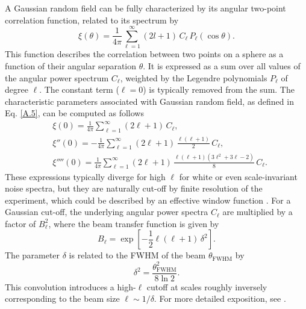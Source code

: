 \documentclass{aa}
\begin{document}
A Gaussian random field can be fully characterized by its angular two-point correlation function, related to its spectrum by
%
\begin{equation}\label{B.1}
  \xi(\theta) = \frac{1}{4\pi}\sum_{\ell=1}^{\infty} (2l+1)\, C_{\ell}\, P_{\ell}(\cos\theta) .
\end{equation}
%
This function describes the correlation between two points on a sphere as a function of their angular separation $\theta$. It is expressed as a sum over all values of the angular power spectrum $C_{\ell}$, weighted by the Legendre polynomials $P_\ell$ of degree $\ell$. The constant term ($\ell=0$) is typically removed from the sum. The characteristic parameters associated with Gaussian random field, as defined in Eq. \eqref{A.5}, can be computed as follows
%
\begin{equation}\label{B.2}
\begin{aligned}
&\xi(0) = \frac{1}{4\pi}\sum_{\ell=1}^{\infty} (2\ell+1)\, C_{\ell},\\
&\xi''(0) = -\frac{1}{4\pi}\sum_{\ell=1}^{\infty} (2\ell+1)\, \frac{\ell(\ell+1)}{2}\, C_{\ell},\\
&\xi''''(0) = \frac{1}{4\pi}\sum_{\ell=1}^{\infty} (2\ell+1)\, \frac{\ell(\ell+1)(3\ell^2+3\ell-2)}{8}\, C_{\ell}.
\end{aligned}
\end{equation}
%
These expressions typically diverge for high $\ell$ for white or even scale-invariant noise spectra, but they are naturally cut-off by finite resolution of the experiment, which could be described by an effective window function \citep{White:1994sx}. For a Gaussian cut-off, the underlying angular power spectra $C_{\ell}$ are multiplied by a factor of $B_{\ell}^{2}$, where the beam transfer function is given by
\begin{equation}
  B_{\ell}=\exp\left[-\frac{1}{2}\ell(\ell+1)\, \delta^2\right] .
\end{equation}
The parameter $\delta$ is related to the FWHM of the beam $\theta_{\textrm{FWHM}}$ by
%
\begin{equation}
    \delta^2 = \frac{\theta_{\textrm{FWHM}}^2}{8\ln2} .
\end{equation}
%
This convolution introduces a high-$\ell$ cutoff at scales roughly inversely corresponding to the beam size $\ell\sim1/\delta$. For more detailed exposition, see \cite{1995ApJ...443....6W}.
\end{document}
